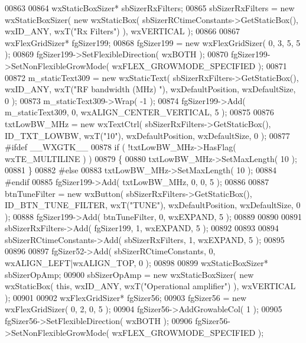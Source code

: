 \begin{DoxyCode}
00863     
00864     wxStaticBoxSizer* sbSizerRxFilters;
00865     sbSizerRxFilters = \textcolor{keyword}{new} wxStaticBoxSizer( \textcolor{keyword}{new} wxStaticBox( sbSizerRCtimeConstants->GetStaticBox(), 
      wxID\_ANY, wxT(\textcolor{stringliteral}{"Rx Filters"}) ), wxVERTICAL );
00866     
00867     wxFlexGridSizer* fgSizer199;
00868     fgSizer199 = \textcolor{keyword}{new} wxFlexGridSizer( 0, 3, 5, 5 );
00869     fgSizer199->SetFlexibleDirection( wxBOTH );
00870     fgSizer199->SetNonFlexibleGrowMode( wxFLEX\_GROWMODE\_SPECIFIED );
00871     
00872     m_staticText309 = \textcolor{keyword}{new} wxStaticText( sbSizerRxFilters->GetStaticBox(), wxID\_ANY, wxT(\textcolor{stringliteral}{"RF bandwidth (MHz)
      "}), wxDefaultPosition, wxDefaultSize, 0 );
00873     m_staticText309->Wrap( -1 );
00874     fgSizer199->Add( m_staticText309, 0, wxALIGN\_CENTER\_VERTICAL, 5 );
00875     
00876     txtLowBW_MHz = \textcolor{keyword}{new} wxTextCtrl( sbSizerRxFilters->GetStaticBox(), 
      ID_TXT_LOWBW, wxT(\textcolor{stringliteral}{"10"}), wxDefaultPosition, wxDefaultSize, 0 );
00877 \textcolor{preprocessor}{    #ifdef \_\_WXGTK\_\_}
00878     \textcolor{keywordflow}{if} ( !txtLowBW_MHz->HasFlag( wxTE\_MULTILINE ) )
00879     \{
00880     txtLowBW_MHz->SetMaxLength( 10 );
00881     \}
00882 \textcolor{preprocessor}{    #else}
00883     txtLowBW_MHz->SetMaxLength( 10 );
00884 \textcolor{preprocessor}{    #endif}
00885     fgSizer199->Add( txtLowBW_MHz, 0, 0, 5 );
00886     
00887     btnTuneFilter = \textcolor{keyword}{new} wxButton( sbSizerRxFilters->GetStaticBox(), 
      ID_BTN_TUNE_FILTER, wxT(\textcolor{stringliteral}{"TUNE"}), wxDefaultPosition, wxDefaultSize, 0 );
00888     fgSizer199->Add( btnTuneFilter, 0, wxEXPAND, 5 );
00889     
00890     
00891     sbSizerRxFilters->Add( fgSizer199, 1, wxEXPAND, 5 );
00892     
00893     
00894     sbSizerRCtimeConstants->Add( sbSizerRxFilters, 1, wxEXPAND, 5 );
00895     
00896     
00897     fgSizer52->Add( sbSizerRCtimeConstants, 0, wxALIGN\_LEFT|wxALIGN\_TOP, 0 );
00898     
00899     wxStaticBoxSizer* sbSizerOpAmp;
00900     sbSizerOpAmp = \textcolor{keyword}{new} wxStaticBoxSizer( \textcolor{keyword}{new} wxStaticBox( \textcolor{keyword}{this}, wxID\_ANY, wxT(\textcolor{stringliteral}{"Operational amplifier"}) ), 
      wxVERTICAL );
00901     
00902     wxFlexGridSizer* fgSizer56;
00903     fgSizer56 = \textcolor{keyword}{new} wxFlexGridSizer( 0, 2, 0, 5 );
00904     fgSizer56->AddGrowableCol( 1 );
00905     fgSizer56->SetFlexibleDirection( wxBOTH );
00906     fgSizer56->SetNonFlexibleGrowMode( wxFLEX\_GROWMODE\_SPECIFIED );

\end{DoxyCode}
